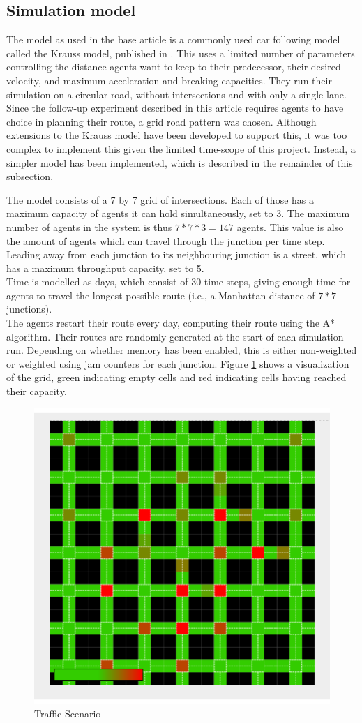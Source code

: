 \documentclass[a4paper,hidelinks]{article}
\begin{document}
\subsection{Simulation model}
The model as used in the base article is a commonly used car following model called the Krauss model, published in \cite{krauss1998microscopic}. This uses a limited number of parameters controlling the distance agents want to keep to their predecessor, their desired velocity, and maximum acceleration and breaking capacities. They run their simulation on a circular road, without intersections and with only a single lane. \\
Since the follow-up experiment described in this article requires agents to have choice in planning their route, a grid road pattern was chosen. Although extensions to the Krauss model have been developed to support this, it was too complex to implement this given the limited time-scope of this project. Instead, a simpler model has been implemented, which is described in the remainder of this subsection.

The model consists of a 7 by 7 grid of intersections. Each of those has a maximum capacity of agents it can hold simultaneously, set to 3. The maximum number of agents in the system is thus $7*7*3=147$ agents. This value is also the amount of agents which can travel through the junction per time step. Leading away from each junction to its neighbouring junction is a street, which has a maximum throughput capacity, set to 5. \\
Time is modelled as days, which consist of 30 time steps, giving enough time for agents to travel the longest possible route (i.e., a Manhattan distance of $7*7$ junctions). \\
The agents restart their route every day, computing their route using the A* algorithm. Their routes are randomly generated at the start of each simulation run. Depending on whether memory has been enabled, this is either non-weighted or weighted using jam counters for each junction.
Figure \ref{fig:grid} shows a visualization of the grid, green indicating empty cells and red indicating cells having reached their capacity.

\begin{figure}[ht!]
\centering
\includegraphics[width = 0.7\linewidth]{grid}
\caption{Traffic Scenario \label{fig:grid}}
\end{figure} 
\end{document}
